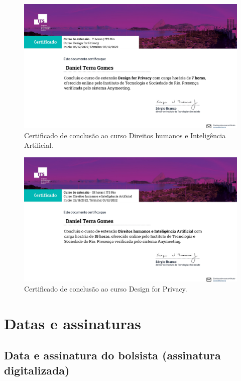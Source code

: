\begin{figure}[H]
\centering
\includegraphics[width=\textwidth]{Figures/its2.pdf}
\caption{Certificado de conclusão ao curso Direitos humanos e Inteligência Artificial.}
\label{Direitos}
\end{figure}

\begin{figure}[H]
\centering
    \includegraphics[width=\textwidth]{Figures/its1.pdf}
\caption{Certificado de conclusão ao curso Design for Privacy.}
\label{Design}
\end{figure}



\chapter{Datas e assinaturas} \label{ass}

\section{Data e assinatura do bolsista (assinatura digitalizada)}


